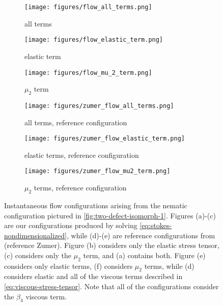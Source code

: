 \documentclass[reqno]{article}
\begin{document}
  
  \begin{figure}[h]
    \centering
    \begin{subfigure}{0.3\textwidth}
      \texttt{[image: figures/flow\_all\_terms.png]}
      \caption{all terms}
      \label{fig:flow_all_terms}
    \end{subfigure}
    \hfill
    \begin{subfigure}{0.3\textwidth}
      \texttt{[image: figures/flow\_elastic\_term.png]}
      \caption{elastic term}
      \label{fig:flow_elastic_term}
    \end{subfigure}
    \hfill
    \begin{subfigure}{0.3\textwidth}
      \texttt{[image: figures/flow\_mu\_2\_term.png]}
      \caption{$\mu_2$ term}
      \label{fig:flow_mu_2_term}
    \end{subfigure}
    \hfill
    \begin{subfigure}{0.3\textwidth}
      \texttt{[image: figures/zumer\_flow\_all\_terms.png]}
      \caption{all terms, reference configuration}
      \label{fig:flow_all_terms}
    \end{subfigure}
    \hfill
    \begin{subfigure}{0.3\textwidth}
      \texttt{[image: figures/zumer\_flow\_elastic\_term.png]}
      \caption{elastic terms, reference configuration}
      \label{fig:flow_elastic_term}
    \end{subfigure}
    \hfill
    \begin{subfigure}{0.3\textwidth}
      \texttt{[image: figures/zumer\_flow\_mu2\_term.png]}
      \caption{$\mu_2$ terms, reference configuration}
      \label{fig:flow_mu_2_term}
    \end{subfigure}
    \caption{Instantaneous flow configurations arising from the nematic
      configuration pictured in \ref{fig:two-defect-isomorph-1}.
      Figures (a)-(c)
      are our configurations produced by solving
      \eqref{eq:stokes-nondimensionalized}, while (d)-(e) are reference
      configurations from (reference Zumer).
      Figure (b) considers only the
      elastic stress tensor, (c) considers only the $\mu_2$ term, and (a)
      contains both.
      Figure (e) considers only elastic terms, (f) considers $\mu_2$ terms,
      while (d) considers elastic and all of the viscous terms described in
      \eqref{eq:viscous-stress-tensor}.
      Note that all of the configurations consider the $\beta_4$ viscous term.}
  \end{figure}
\end{document}

